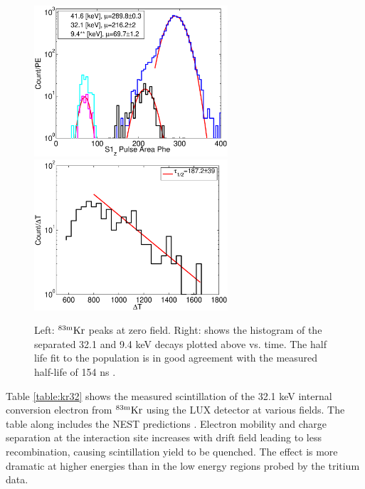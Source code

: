  \begin{figure}[h!]\centering
\includegraphics[width=72mm]{Chapter_Flucs/Figures/S1_Z_no_field_lux10_20131009T1358_cp09670} %
\includegraphics[width=72mm]{Chapter_Flucs/Figures/dT_no_field_2lux10_20131009T1358_cp09670}
\caption{Left: $\rm^{83m}Kr$ peaks at zero field. Right: shows the histogram of the separated 32.1 and 9.4 keV decays plotted above vs. time. The half life fit to the population is in good agreement with the measured half-life of 154 ns \cite{83Kr_HalfLife_1} \cite{83Kr_HalfLife_2}. }
\label{fig:ZeroField_Kr}
\end{figure}

Table \ref{table:kr32} shows the measured scintillation of the 32.1 keV internal conversion electron from $\rm ^{83m}Kr$ using the LUX detector at various fields. The table along includes the NEST predictions \cite{NEST_2013}. Electron mobility and charge separation at the interaction site increases with drift field leading to less recombination, causing scintillation yield to be quenched. The effect is more dramatic at higher energies than in the low energy regions probed by the tritium data.

